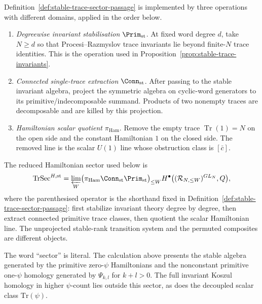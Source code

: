 \documentclass[11pt]{memoir}
\begin{document}
\begin{defn}\label{defn:three-stable-trace-operations}
  Definition~\ref{def:stable-trace-sector-passage} is implemented by
  three operations with different domains, applied in the order below.
  \begin{enumerate}
    \item \emph{Degreewise invariant stabilisation}
      \(\Prim_{\mathrm{st}}\).  At fixed word degree \(d\), take
      \(N\ge d\) so that Procesi--Razmyslov trace invariants lie beyond
      finite-\(N\) trace identities.  This is the operation used in
      Proposition~\ref{prop:stable-trace-invariants}.
    \item \emph{Connected single-trace extraction}
      \(\Conn_{\mathrm{st}}\).  After passing to the stable invariant
      algebra, project the symmetric algebra on cyclic-word generators to
      its primitive/indecomposable summand.  Products of two nonempty
      traces are decomposable and are killed by this projection.
    \item \emph{Hamiltonian scalar quotient}
      \(\pi_{\mathrm{Ham}}\).  Remove the empty trace
      \(\operatorname{Tr}(1)=N\) on the open side and the constant
      Hamiltonian \(1\) on the closed side.  The removed line is the
      scalar \(U(1)\) line
      whose obstruction class is \([\bar c]\).
  \end{enumerate}
  The reduced Hamiltonian sector used below is
  \[
    \operatorname{TrSec}^{H,\mathrm{st}}
      =
      \varprojlim_W
      \bigl(
        \pi_{\mathrm{Ham}}\Conn_{\mathrm{st}}\Prim_{\mathrm{st}}
      \bigr)_{\leq W}
      H^\bullet\bigl((\mathcal R_{N,\leq W})^{GL_N},Q\bigr),
  \]
  where the parenthesised operator is the shorthand fixed in
  Definition~\ref{def:stable-trace-sector-passage}: first stabilize
  invariant theory degree by degree, then extract connected primitive
  trace classes, then quotient the scalar Hamiltonian line. The
  unprojected stable-rank transition system and the permuted composites
  are different objects.
\end{defn}

\begin{rmk}
  The word ``sector'' is literal. The calculation above presents the stable
  algebra generated by the primitive zero-$\psi$ Hamiltonians and the nonconstant
  primitive one-$\psi$ homology generated by $\Psi_{k,l}$ for $k+l>0$. The full
  invariant Koszul homology in higher $\psi$-count lies outside this sector, as
  does the decoupled scalar class $\mathrm{Tr}(\psi)$.
\end{rmk}
\end{document}
